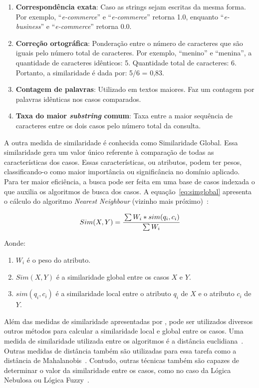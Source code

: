\begin{enumerate}
	\item \textbf{Correspondência exata}: Caso as strings sejam escritas da mesma forma. Por exemplo, ``\emph{e-commerce}'' e ``\emph{e-commerce}'' retorna 1.0, enquanto ``\emph{e-business}'' e ``\emph{e-commerce}'' retorna 0.0.
	\item \textbf{Correção ortográfica}: Ponderação entre o número de caracteres que são iguais pelo número total de caracteres. Por exemplo, ``menino'' e ``menina'', a quantidade de caracteres idênticos: 5. Quantidade total de caracteres: 6. Portanto, a similaridade é dada por: 5/6 = 0,83.
	\item \textbf{Contagem de palavras}: Utilizado em textos maiores. Faz um contagem por palavras idênticas nos casos comparados.
	\item \textbf{Taxa do maior \emph{substring} comum}: Taxa entre a maior sequência de caracteres entre os dois casos pelo número total da consulta.
\end{enumerate}

A outra medida de similaridade é conhecida como Similaridade Global. Essa similaridade gera um valor único referente à comparação de todas as características dos casos. Essas características, ou atributos, podem ter pesos, classificando-o como maior importância ou significância no domínio aplicado. Para ter maior eficiência, a busca pode ser feita em uma base de casos indexada o que auxilia os algoritmos de busca dos casos. A equação~\ref{eq:simglobal} apresenta o cálculo do algoritmo \emph{Nearest Neighbour} (vizinho mais próximo)~\cite{Gresse:2003}:

\begin{equation}
	Sim (X, Y) = \cfrac{\sum W_i * sim(q_i, c_i)}{\sum W_i}
	\label{eq:simglobal}
\end{equation}

\begin{flushleft}
	Aonde:
	\begin{enumerate}
		\item $W_i$ é o peso do atributo.
		\item $Sim (X, Y)$ é a similaridade global entre os casos $X$ e $Y$.
		\item $sim (q_i, c_i)$ é a similaridade local entre o atributo $q_i$ de $X$ e o atributo $c_i$ de $Y$.
	\end{enumerate}
\end{flushleft}

Além das medidas de similaridade apresentadas por , pode ser utilizados diversos outros métodos para calcular a similaridade local e global entre os casos. Uma medida de similaridade utilizada entre os algoritmos é a distância euclidiana~\cite{Masiero:2013}. Outras medidas de distância também são utilizadas para essa tarefa como a distância de Mahalanobis~\cite{Mahalanobis:1936}. Contudo, outras técnicas também são capazes de determinar o valor da similaridade entre os casos, como no caso da Lógica Nebulosa ou Lógica Fuzzy~\cite{Lopez:2013}.


